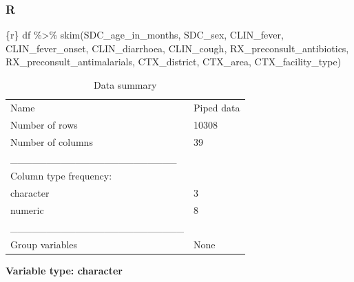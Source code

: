 \documentclass[
  letterpaper,
  DIV=11,
  numbers=noendperiod,
  oneside]{scrreprt}
\newenvironment{Shaded}{\begin{snugshade}}{\end{snugshade}}
\newcommand{\FunctionTok}[1]{\textcolor[rgb]{0.28,0.35,0.67}{#1}}
\newcommand{\InformationTok}[1]{\textcolor[rgb]{0.37,0.37,0.37}{#1}}
\newcommand{\NormalTok}[1]{\textcolor[rgb]{0.00,0.23,0.31}{#1}}
\newcommand{\SpecialCharTok}[1]{\textcolor[rgb]{0.37,0.37,0.37}{#1}}
\begin{document}
\hypertarget{r-5}{%
\subsubsection{R}\label{r-5}}

\begin{Shaded}
\begin{Highlighting}[]
\InformationTok{\textasciigrave{}\textasciigrave{}\textasciigrave{}\{r\}}
\NormalTok{df }\SpecialCharTok{\%\textgreater{}\%}
  \FunctionTok{skim}\NormalTok{(SDC\_age\_in\_months,}
\NormalTok{       SDC\_sex,}
\NormalTok{       CLIN\_fever,}
\NormalTok{       CLIN\_fever\_onset,}
\NormalTok{       CLIN\_diarrhoea,}
\NormalTok{       CLIN\_cough,}
\NormalTok{       RX\_preconsult\_antibiotics,}
\NormalTok{       RX\_preconsult\_antimalarials,}
\NormalTok{       CTX\_district,}
\NormalTok{       CTX\_area,}
\NormalTok{       CTX\_facility\_type)}
\InformationTok{\textasciigrave{}\textasciigrave{}\textasciigrave{}}
\end{Highlighting}
\end{Shaded}

\begin{longtable}[]{@{}ll@{}}
\caption{Data summary}\tabularnewline
\toprule()
\endhead
Name & Piped data \\
Number of rows & 10308 \\
Number of columns & 39 \\
\_\_\_\_\_\_\_\_\_\_\_\_\_\_\_\_\_\_\_\_\_\_\_ & \\
Column type frequency: & \\
character & 3 \\
numeric & 8 \\
\_\_\_\_\_\_\_\_\_\_\_\_\_\_\_\_\_\_\_\_\_\_\_\_ & \\
Group variables & None \\
\bottomrule()
\end{longtable}

\textbf{Variable type: character}
\end{document}
